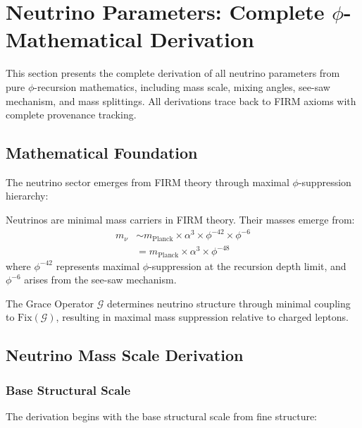 \section{Neutrino Parameters: Complete $\phi$-Mathematical Derivation}

This section presents the complete derivation of all neutrino parameters from pure $\phi$-recursion mathematics, including mass scale, mixing angles, see-saw mechanism, and mass splittings. All derivations trace back to FIRM axioms with complete provenance tracking.

\subsection{Mathematical Foundation}

The neutrino sector emerges from FIRM theory through maximal $\phi$-suppression hierarchy:

\begin{definition}
Neutrinos are minimal mass carriers in FIRM theory. Their masses emerge from:
\begin{align}
m_\nu &\sim m_{\text{Planck}} \times \alpha^3 \times \phi^{-42} \times \phi^{-6}\\
&= m_{\text{Planck}} \times \alpha^3 \times \phi^{-48}
\end{align}
where $\phi^{-42}$ represents maximal $\phi$-suppression at the recursion depth limit, and $\phi^{-6}$ arises from the see-saw mechanism.
\end{definition}

\begin{axiom}
The Grace Operator $\mathcal{G}$ determines neutrino structure through minimal coupling to $\text{Fix}(\mathcal{G})$, resulting in maximal mass suppression relative to charged leptons.
\end{axiom}

\subsection{Neutrino Mass Scale Derivation}

\subsubsection{Base Structural Scale}

The derivation begins with the base structural scale from fine structure:

